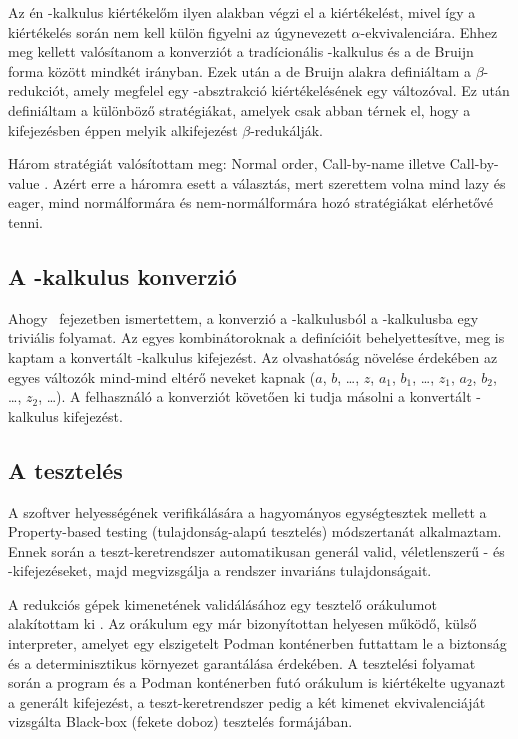 \documentclass[a4paper,oneside]{article}
\begin{document}
Az én \lam-kalkulus kiértékelőm ilyen alakban végzi el a kiértékelést, mivel így a kiértékelés során nem kell külön figyelni az úgynevezett \(\alpha\)-ekvivalenciára. Ehhez meg kellett valósítanom a konverziót a tradícionális \lam-kalkulus és a de Bruijn forma között mindkét irányban. Ezek után a de Bruijn alakra definiáltam a \(\beta\)-redukciót, amely megfelel egy \lam-absztrakció kiértékelésének egy változóval. Ez után definiáltam a különböző stratégiákat, amelyek csak abban térnek el, hogy a kifejezésben éppen melyik alkifejezést \(\beta\)-redukálják.

Három stratégiát valósítottam meg: \foreignlanguage{english}{Normal order}, \foreignlanguage{english}{Call-by-name} illetve \foreignlanguage{english}{Call-by-value} \cite{Lambdakalkulus2007}. Azért erre a háromra esett a választás, mert szerettem volna mind \foreignlanguage{english}{lazy} és \foreignlanguage{english}{eager}, mind normálformára és nem-normálformára hozó stratégiákat elérhetővé tenni.

\subsection{A \ski-kalkulus konverzió}
\label{sec:a-ski-kalkulus-konverzio}

Ahogy ~fejezetben ismertettem, a konverzió a \ski-kalkulusból a \lam-kalkulusba egy triviális folyamat. Az egyes kombinátoroknak a definícióit behelyettesítve, meg is kaptam a konvertált \lam-kalkulus kifejezést. Az olvashatóság növelése érdekében az egyes változók mind-mind eltérő neveket kapnak (\(a\), \(b\), \dots, \(z\), \(a_1\), \(b_1\), \dots, \(z_1\), \(a_2\), \(b_2\), \dots, \(z_2\), \dots). A felhasználó a konverziót követően ki tudja másolni a konvertált \lam-kalkulus kifejezést.


\subsection{A tesztelés}
\label{sec:a-teszt-orakulum-kialak}

A szoftver helyességének verifikálására a hagyományos egységtesztek mellett a \foreignlanguage{english}{Property-based testing} (tulajdonság-alapú tesztelés) módszertanát alkalmaztam. Ennek során a teszt-keretrendszer automatikusan generál valid, véletlenszerű \lam- és \ski-kifejezéseket, majd megvizsgálja a rendszer invariáns tulajdonságait.

A redukciós gépek kimenetének validálásához egy tesztelő orákulumot alakítottam ki \cite{howdenTheoreticalEmpiricalStudies1978}. Az orákulum egy már bizonyítottan helyesen működő, külső interpreter, amelyet egy elszigetelt Podman konténerben futtattam le a biztonság és a determinisztikus környezet garantálása érdekében. A tesztelési folyamat során a program és a Podman konténerben futó orákulum is kiértékelte ugyanazt a generált kifejezést, a teszt-keretrendszer pedig a két kimenet ekvivalenciáját vizsgálta \foreignlanguage{english}{Black-box} (fekete doboz) tesztelés formájában.
\end{document}
